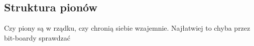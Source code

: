 \subsection{Struktura pionów}
\label{subsec:struktura-pionow}

{
    \color{red}
    \large Czy piony są w rządku, czy chronią siebie wzajemnie.
Najłatwiej to chyba przez bit-boardy sprawdzać
}